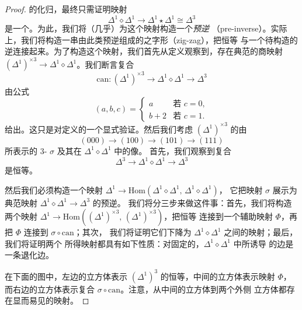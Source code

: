 \begin{proof}
的化归，最终只需证明映射
\[
\Delta^1 \diamond \Delta^1 \to \Delta^1 \star \Delta^1 \cong \Delta^3
\]
是一个\trJoyalEquivalence{}。为此，我们将（几乎）为这个映射构造一个\emph{预逆}
（pre-inverse）。实际上，我们将构造一串由此类预逆组成的之字形（zig-zag），把恒等
与一个待构造的逆连接起来。为了构造这个映射，我们首先从定义观察到，存在典范的商映射
$(\Delta^1)^{\times 3} \to \Delta^1 \diamond \Delta^1$。我们断言复合
\[
\mathrm{can}\colon (\Delta^1)^{\times 3} \longrightarrow \Delta^1 \diamond \Delta^1
\longrightarrow \Delta^3
\]
由公式
\[
(a, b, c) =
\begin{cases}
a & \text{若 } c = 0, \\
b + 2 & \text{若 } c = 1.
\end{cases}
\]
给出。这只是对定义的一个显式验证。然后我们考虑 $(\Delta^1)^{\times 3}$ 的由
\[
(000) \longrightarrow (100) \longrightarrow (101) \longrightarrow (111)
\]
所表示的 $3$-\trSimplex{} $\sigma$ 及其在 $\Delta^1 \diamond \Delta^1$ 中的像。
首先，我们观察到复合
\[
\Delta^3 \longrightarrow \Delta^1 \diamond \Delta^1 \longrightarrow \Delta^3
\]
是恒等。

然后我们必须构造一个映射
$\Delta^1 \to \mathrm{Hom}(\Delta^1 \diamond \Delta^1,\, \Delta^1 \diamond \Delta^1)$，
它把映射 $\sigma$ 展示为典范映射 $\Delta^1 \diamond \Delta^1 \to \Delta^3$ 的预逆。
我们将分三步来做这件事：首先，我们将构造两个映射
$\Delta^1 \to \mathrm{Hom}((\Delta^1)^{\times 3},\, (\Delta^1)^{\times 3})$，把恒等
连接到一个辅助映射 $\Phi$，再把 $\Phi$ 连接到 $\sigma \circ \mathrm{can}$；其次，
我们将证明它们下降为 $\Delta^1 \diamond \Delta^1$ 之间的映射；最后，我们将证明两个
所得映射都具有如下性质：对固定的\trObject{}，$\Delta^1 \diamond \Delta^1$ 中所诱导
的边是一条退化边。

在下面的图中，左边的立方体表示 $(\Delta^1)^3$ 的恒等，中间的立方体表示映射 $\Phi$，
而右边的立方体表示复合 $\sigma \circ \mathrm{can}$。注意，从中间的立方体到两个外侧
立方体都存在显而易见的映射。


\end{proof}
